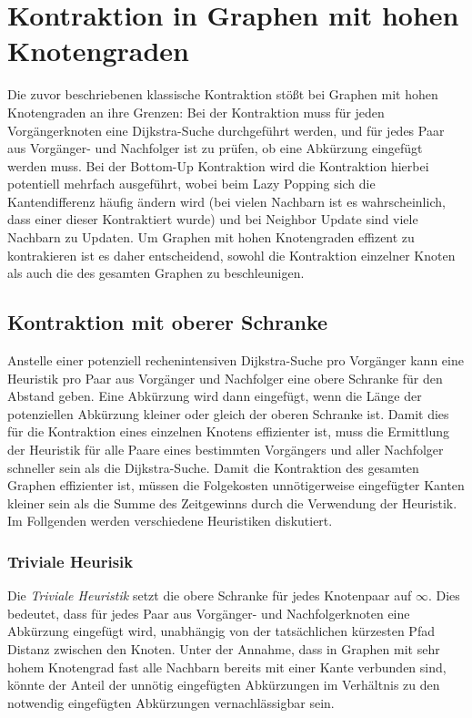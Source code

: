 \chapter{Kontraktion in Graphen mit hohen Knotengraden}\label{chapter:kontraktion}

Die zuvor beschriebenen klassische Kontraktion stößt bei Graphen mit hohen Knotengraden an ihre Grenzen:
Bei der Kontraktion muss für jeden Vorgängerknoten eine Dijkstra-Suche durchgeführt werden, und für jedes Paar aus Vorgänger- und Nachfolger ist zu prüfen, ob eine Abkürzung eingefügt werden muss.
Bei der Bottom-Up Kontraktion wird die Kontraktion hierbei potentiell mehrfach ausgeführt, wobei beim Lazy Popping sich die Kantendifferenz häufig ändern wird (bei vielen Nachbarn ist es wahrscheinlich, dass einer dieser Kontraktiert wurde) und bei Neighbor Update sind viele Nachbarn zu Updaten.
Um Graphen mit hohen Knotengraden effizent zu kontrakieren ist es daher entscheidend, sowohl die Kontraktion einzelner Knoten als auch die des gesamten Graphen zu beschleunigen.

\section{Kontraktion mit oberer Schranke}
Anstelle einer potenziell rechenintensiven Dijkstra-Suche pro Vorgänger kann eine Heuristik pro Paar aus Vorgänger und Nachfolger eine obere Schranke für den Abstand geben.
Eine Abkürzung wird dann eingefügt, wenn die Länge der potenziellen Abkürzung kleiner oder gleich der oberen Schranke ist.
Damit dies für die Kontraktion eines einzelnen Knotens effizienter ist, muss die Ermittlung der Heuristik für alle Paare eines bestimmten Vorgängers und aller Nachfolger schneller sein als die Dijkstra-Suche.
Damit die Kontraktion des gesamten Graphen effizienter ist, müssen die Folgekosten unnötigerweise eingefügter Kanten kleiner sein als die Summe des Zeitgewinns durch die Verwendung der Heuristik.
Im Follgenden werden verschiedene Heuristiken diskutiert.

\subsection{Triviale Heurisik}
Die \emph{Triviale Heuristik} setzt die obere Schranke für jedes Knotenpaar auf $\infty$.
Dies bedeutet, dass für jedes Paar aus Vorgänger- und Nachfolgerknoten eine Abkürzung eingefügt wird, unabhängig von der tatsächlichen kürzesten Pfad Distanz zwischen den Knoten.
Unter der Annahme, dass in Graphen mit sehr hohem Knotengrad fast alle Nachbarn bereits mit einer Kante verbunden sind, könnte der Anteil der unnötig eingefügten Abkürzungen im Verhältnis zu den notwendig eingefügten Abkürzungen vernachlässigbar sein.

